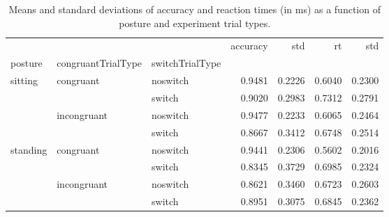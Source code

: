 \begin{table}
\centering
\caption{Means and standard deviations of accuracy and reaction times (in ms) as a function of posture and experiment trial types.}
\label{table-task-switching-replication-reaction-time}
\begin{tabular}{lllrrrr}
\toprule
         &             &        & accuracy &    std &     rt &    std \\
posture & congruantTrialType & switchTrialType &          &        &        &        \\
\midrule
sitting & congruant & noswitch &   0.9481 & 0.2226 & 0.6040 & 0.2300 \\
         &             & switch &   0.9020 & 0.2983 & 0.7312 & 0.2791 \\
         & incongruant & noswitch &   0.9477 & 0.2233 & 0.6065 & 0.2464 \\
         &             & switch &   0.8667 & 0.3412 & 0.6748 & 0.2514 \\
standing & congruant & noswitch &   0.9441 & 0.2306 & 0.5602 & 0.2016 \\
         &             & switch &   0.8345 & 0.3729 & 0.6985 & 0.2324 \\
         & incongruant & noswitch &   0.8621 & 0.3460 & 0.6723 & 0.2603 \\
         &             & switch &   0.8951 & 0.3075 & 0.6845 & 0.2362 \\
\bottomrule
\end{tabular}
\end{table}
